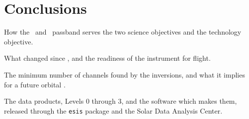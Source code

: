 \section{Conclusions}%
\label{sec:Conclusions}%

\begin{outline}
\item How the \NeVII\ and \SiXII\ passband serves the two science objectives and the technology
    objective.
\item What changed since \ESISI, and the readiness of the instrument for flight.
\item The minimum number of channels found by the inversions, and what it implies for a future
    orbital \CTIS.
\item The data products, Levels 0 through 3, and the software which makes them, released through
    the \texttt{esis} package and the Solar Data Analysis Center.
\end{outline}
